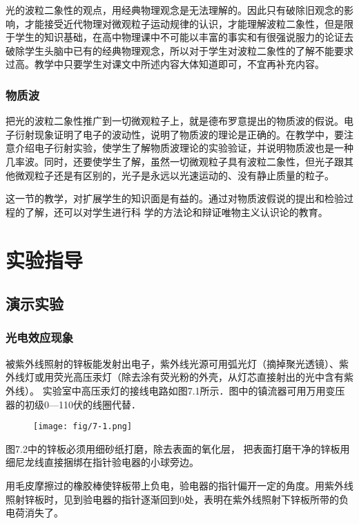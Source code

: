 光的波粒二象性的观点，用经典物理观念是无法理解的。因此只有破除旧观念的影响，才能接受近代物理对微观粒子运动规律的认识，才能理解波粒二象性，但是限于学生的知识基础，在高中物理课中不可能以丰富的事实和有很强说服力的论证去破除学生头脑中已有的经典物理观念，所以对于学生对波粒二象性的了解不能要求过高。教学中只要学生对课文中所述内容大体知道即可，不宜再补充内容。

\subsubsection{物质波}

把光的波粒二象性推广到一切微观粒子上，就是德布罗意提出的物质波的假说。电子衍射现象证明了电子的波动性，说明了物质波的理论是正确的。在教学中，要注意介绍电子衍射实验，使学生了解物质波理论的实验验证，并说明物质波也是一种几率波。同时，还要使学生了解，虽然一切微观粒子具有波粒二象性，但光子跟其他微观粒子还是有区别的，光子是永远以光速运动的、没有静止质量的粒子。

这一节的教学，对扩展学生的知识面是有益的。通过对物质波假说的提出和检验过程的了解，还可以对学生进行科
学的方法论和辩证唯物主义认识论的教育。

\section{实验指导}
\subsection{演示实验}
\subsubsection{光电效应现象}

被紫外线照射的锌板能发射出电子，紫外线光源可用弧光灯（摘掉聚光透镜）、紫外线灯或用荧光高压汞灯（除去涂有荧光粉的外壳，从灯芯直接射出的光中含有紫外线）。 实验室中高压汞灯的接线电路如图7.1所示．图中的镇流器可用万用变压器的初级0—110伏的线圈代替．
\begin{figure}[htp]
    \centering
\texttt{[image: fig/7-1.png]}
    \caption{}
\end{figure}

图7.2中的锌板必须用细砂纸打磨，除去表面的氧化层，
把表面打磨干净的锌板用细尼龙线直接捆绑在指针验电器的小球旁边。

用毛皮摩擦过的橡胶棒使锌板带上负电，验电器的指针偏开一定的角度。用紫外线照射锌板时，见到验电器的指针逐渐回到0处，表明在紫外线照射下锌板所带的负电荷消失了。

